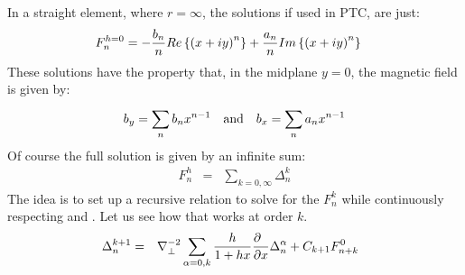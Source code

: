In a straight element, where %
$r=
\infty $,
the solutions if  used in PTC, are just:
%
\begin{eqnarray}{F}_{n}^{h=
0}&=-{{b}_{n} \over n}Re\left\{{{\left({x+iy}\right)}^{n}}\right\}+{{a}_{n} \over n}Im\left\{{{\left({x+iy}\right)}^{n}}\right\}  \label{eq:hsol} \end{eqnarray}
%
%
These solutions have the property that, in the midplane $y=0$,  the magnetic field is given by:
%
\begin{eqnarray}{b}_{y}=
\sum\limits_{n}^{} {b}_{n}{x}^{n-1}~~~{\rm a}{\rm n}{\rm d} ~~~{b}_{x}=
\sum\limits_{n}^{} {a}_{n}{x}^{n-1} \label{eq:st:anbn}\end{eqnarray}
%
%
Of course the full solution is given by an infinite sum:
%
\begin{eqnarray}{F}_{n}^{h} &=
& \sum\limits_{k=
0,\infty }^{} {\Delta }_{n}^{k}\label{fnk}\end{eqnarray}
%
%
The idea is to set up a recursive relation to solve for the $F_n^k$ while continuously respecting  and . Let us see how that works at order $k$. 
%
\begin{eqnarray}{\Delta }_{n}^{k+1} &=
&{\nabla }_{\perp }^{-2}\sum\limits_{\alpha =
0,k}^{} {h \over 1+hx}{\partial \hphantom{x} \over \partial x}{\Delta }_{n}^{\alpha }+{C}_{k+1}{F}_{n+k}^{0}\ \ \label{eq:sol:anbn}\end{eqnarray}
